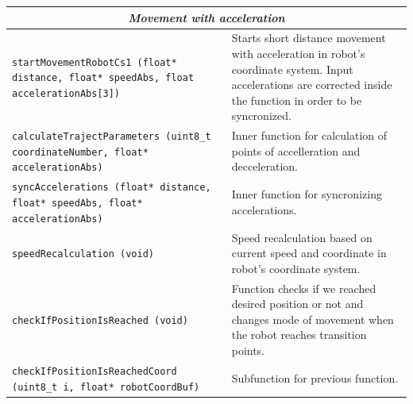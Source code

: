 \documentclass[a4paper,12pt]{article} %
\newcommand{\textitbf}[1]{\textbf{\textit{#1}}}
\newcommand{\inlinecode}[1]{\lstinline{#1}}
\begin{document}
\begin{longtable}[H]{|m{6 cm}|m{7 cm}|}
\multicolumn{2}{|c|}{\textitbf{Movement with acceleration}}\\
\hline
\inlinecode{startMovementRobotCs1 (float* distance, float* speedAbs, float accelerationAbs[3])} & Starts short distance movement with acceleration in robot's coordinate system. Input accelerations are corrected inside the function in order to be syncronized.\\
\hline
\inlinecode{calculateTrajectParameters (uint8_t coordinateNumber, float* accelerationAbs)} & Inner function for calculation of points of accelleration and decceleration.\\
\hline
\inlinecode{syncAccelerations (float* distance, float* speedAbs, float* accelerationAbs)} & Inner function for syncronizing accelerations.\\
\hline
\inlinecode{speedRecalculation (void)} & Speed recalculation based on current speed and coordinate in robot's coordinate system.\\
\hline
\inlinecode{checkIfPositionIsReached (void)} & Function checks if we reached desired position or not and changes mode of movement when the robot reaches transition points.\\
\hline
\inlinecode{checkIfPositionIsReachedCoord (uint8_t i, float* robotCoordBuf)} & Subfunction for previous function.\\
\hline
\end{longtable}
\end{document}
